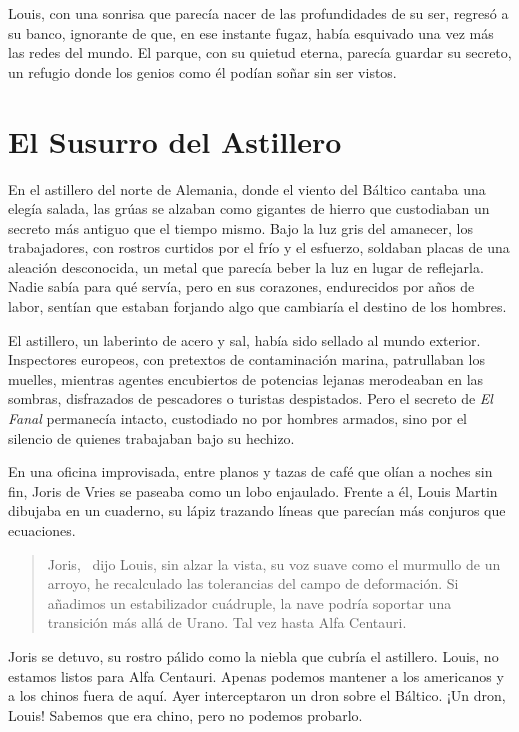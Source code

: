 Louis, con una sonrisa que parecía nacer de las profundidades de su ser, regresó a su banco, ignorante de que, en ese instante fugaz, había esquivado una vez más las redes del mundo. El parque, con su quietud eterna, parecía guardar su secreto, un refugio donde los genios como él podían soñar sin ser vistos.

\section{El Susurro del Astillero}

En el astillero del norte de Alemania, donde el viento del Báltico cantaba una elegía salada, las grúas se alzaban como gigantes de hierro que custodiaban un secreto más antiguo que el tiempo mismo. Bajo la luz gris del amanecer, los trabajadores, con rostros curtidos por el frío y el esfuerzo, soldaban placas de una aleación desconocida, un metal que parecía beber la luz en lugar de reflejarla. Nadie sabía para qué servía, pero en sus corazones, endurecidos por años de labor, sentían que estaban forjando algo que cambiaría el destino de los hombres.

El astillero, un laberinto de acero y sal, había sido sellado al mundo exterior. Inspectores europeos, con pretextos de contaminación marina, patrullaban los muelles, mientras agentes encubiertos de potencias lejanas merodeaban en las sombras, disfrazados de pescadores o turistas despistados. Pero el secreto de \emph{El Fanal} permanecía intacto, custodiado no por hombres armados, sino por el silencio de quienes trabajaban bajo su hechizo.

En una oficina improvisada, entre planos y tazas de café que olían a noches sin fin, Joris de Vries se paseaba como un lobo enjaulado. Frente a él, Louis Martin dibujaba en un cuaderno, su lápiz trazando líneas que parecían más conjuros que ecuaciones.

\begin{quote}
\calligra
\glqq Joris,\grqq~ dijo Louis, sin alzar la vista, su voz suave como el murmullo de un arroyo, \glqq he recalculado las tolerancias del campo de deformación. Si añadimos un estabilizador cuádruple, la nave podría soportar una transición más allá de Urano. Tal vez hasta Alfa Centauri.\grqq
\end{quote}

Joris se detuvo, su rostro pálido como la niebla que cubría el astillero. \glqq Louis, no estamos listos para Alfa Centauri. Apenas podemos mantener a los americanos y a los chinos fuera de aquí. Ayer interceptaron un dron sobre el Báltico. ¡Un dron, Louis! Sabemos que era chino, pero no podemos probarlo.\grqq

